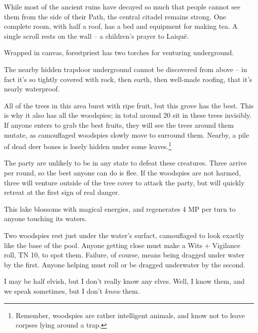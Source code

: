 \begin{multicols}{2}

\label{lost_citadel}
While most of the ancient ruins have decayed so much that people cannot see them from the side of their Path, the central citadel remains strong.  One complete room,  with half a roof, has a bed and equipment for making tea.  A single scroll rests on the wall -- a children's prayer to Laiqu\"{e}.

Wrapped in canvas, \gls{forestpriest} has two torches for venturing underground.

The nearby hidden trapdoor underground cannot be discovered from above -- in fact it's so tightly covered with rock, then earth, then well-made roofing, that it's nearly waterproof.


All of the trees in this area burst with ripe fruit, but this grove has the best.  This is why it also has all the woodspies; in total around 20 sit in these trees invisibly.  If anyone enters to grab the best fruits, they will see the trees around them mutate, as camouflaged woodspies slowly move to surround them.  Nearby, a pile of dead deer bones is losely hidden under some leaves.\footnote{Remember, woodspies are rather intelligent animals, and know not to leave corpses lying around a trap.}


The party are unlikely to be in any state to defeat these creatures.  Three arrive per round, so the best anyone can do is flee.  If the woodspies are not harmed, three will venture outside of the tree cover to attack the party, but will quickly retreat at the first sign of real danger.

\woodspy


This lake blossoms with magical energies, and regenerates 4 MP per turn to anyone touching its waters.

Two woodspies rest just under the water's surfact, camouflaged to look exactly like the base of the pool.  Anyone getting close must make a Wits + Vigilance roll, TN 10, to spot them.  Failure, of course, means being dragged under water by the first.  Anyone helping must roll or be dragged underwater by the second.


\begin{speechtext}
	I may be half elvish, but I don't really know any elves.  Well, I know them, and we speak sometimes, but I don't \emph{know} them.


\end{speechtext}
\end{multicols}

